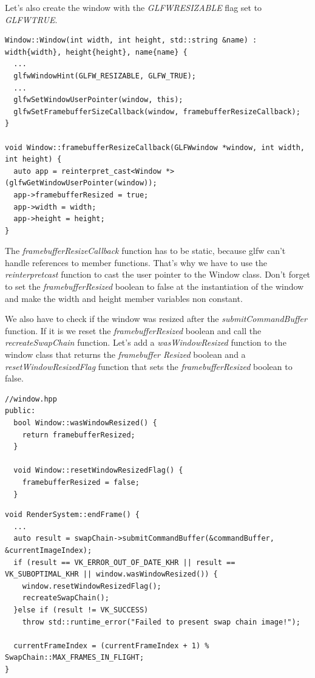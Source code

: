 \documentclass[12pt]{report} \usepackage{preamble}
\begin{document}
Let's also create the window with the \textit{GLFW\textunderscore RESIZABLE} flag set to \textit{GLFW\textunderscore TRUE}.

\begin{lstlisting}[Language=C++]
Window::Window(int width, int height, std::string &name) : width{width}, height{height}, name{name} {
  ...
  glfwWindowHint(GLFW_RESIZABLE, GLFW_TRUE);
  ...
  glfwSetWindowUserPointer(window, this);
  glfwSetFramebufferSizeCallback(window, framebufferResizeCallback);
}

void Window::framebufferResizeCallback(GLFWwindow *window, int width, int height) {
  auto app = reinterpret_cast<Window *>(glfwGetWindowUserPointer(window));
  app->framebufferResized = true;
  app->width = width;
  app->height = height;
}
\end{lstlisting}

The \textit{framebufferResizeCallback} function has to be static, because glfw can't handle references to member functions. That's why we have to use the
\textit{reinterpret\textunderscore cast} function to cast the user pointer to the Window class. Don't forget to set the \textit{framebufferResized} boolean to
false at the instantiation of the window and make the width and height member variables non constant.

We also have to check if the window was resized after the \textit{submitCommandBuffer} function. If it is we reset the \textit{framebufferResized} boolean
and call the \textit{recreateSwapChain} function. Let's add a \textit{wasWindowResized} function to the window class that returns the \textit{framebuffer
	Resized} boolean and a \textit{resetWindowResizedFlag} function that sets the \textit{framebufferResized} boolean to false.

\begin{lstlisting}[Language=C++]
//window.hpp
public:
  bool Window::wasWindowResized() {
    return framebufferResized;
  }

  void Window::resetWindowResizedFlag() {
    framebufferResized = false;
  }
\end{lstlisting}

\begin{lstlisting}[Language=C++]
void RenderSystem::endFrame() {
  ...
  auto result = swapChain->submitCommandBuffer(&commandBuffer, &currentImageIndex);
  if (result == VK_ERROR_OUT_OF_DATE_KHR || result == VK_SUBOPTIMAL_KHR || window.wasWindowResized()) {
    window.resetWindowResizedFlag();
    recreateSwapChain();
  }else if (result != VK_SUCCESS)
    throw std::runtime_error("Failed to present swap chain image!");

  currentFrameIndex = (currentFrameIndex + 1) % SwapChain::MAX_FRAMES_IN_FLIGHT;
}
\end{lstlisting}
\end{document}
